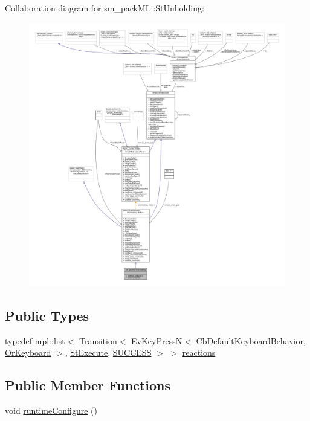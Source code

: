 Collaboration diagram for sm\+\_\+pack\+ML\+:\+:St\+Unholding\+:
\nopagebreak
\begin{figure}[H]
\begin{center}
\leavevmode
\includegraphics[width=350pt]{structsm__packML_1_1StUnholding__coll__graph}
\end{center}
\end{figure}
\subsection*{Public Types}
\begin{DoxyCompactItemize}
\item 
typedef mpl\+::list$<$ Transition$<$ Ev\+Key\+PressN$<$ Cb\+Default\+Keyboard\+Behavior, \hyperlink{classsm__packML_1_1OrKeyboard}{Or\+Keyboard} $>$, \hyperlink{structsm__packML_1_1StExecute}{St\+Execute}, \hyperlink{classSUCCESS}{S\+U\+C\+C\+E\+SS} $>$ $>$ \hyperlink{structsm__packML_1_1StUnholding_a3818ebacf18ce5dd2351fdfa84254354}{reactions}
\end{DoxyCompactItemize}
\subsection*{Public Member Functions}
\begin{DoxyCompactItemize}
\item 
void \hyperlink{structsm__packML_1_1StUnholding_a2f5506132c1e20686a83fcbe4e3c3861}{runtime\+Configure} ()
\end{DoxyCompactItemize}
